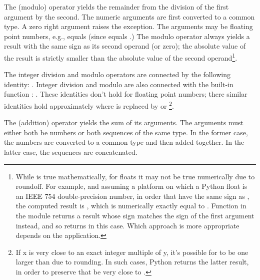 The \code{\%} (modulo) operator yields the remainder from the
division of the first argument by the second.  The numeric arguments
are first converted to a common type.  A zero right argument raises
the  exception.  The arguments may be floating
point numbers, e.g.,  equals  (since
 equals .)  The modulo operator always
yields a result with the same sign as its second operand (or zero);
the absolute value of the result is strictly smaller than the absolute
value of the second operand\footnote{
    While  is true mathematically, for
    floats it may not be true numerically due to roundoff.  For
    example, and assuming a platform on which a Python float is an
    IEEE 754 double-precision number, in order that 
    have the same sign as , the computed result is
    , which is numerically exactly equal
    to .  Function  in the 
    module returns a result whose sign matches the sign of the
    first argument instead, and so returns  in this case.
    Which approach is more appropriate depends on the application.
}.

The integer division and modulo operators are connected by the
following identity: .  Integer division and
modulo are also connected with the built-in function :
.  These identities don't hold for
floating point numbers; there similar identities hold
approximately where  is replaced by  or
\footnote{
    If x is very close to an exact integer multiple of y, it's
    possible for  to be one larger than
     due to rounding.  In such cases, Python returns
    the latter result, in order to preserve that  be very close to .
}.


The \code{+} (addition) operator yields the sum of its arguments.
The arguments must either both be numbers or both sequences of the
same type.  In the former case, the numbers are converted to a common
type and then added together.  In the latter case, the sequences are
concatenated.

